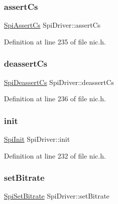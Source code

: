\subsubsection{\texorpdfstring{assert\+Cs}{assertCs}}
{\footnotesize\ttfamily \hyperlink{nic_8h_a5367e86c609a9e08a7fdaeb4ea35035b}{Spi\+Assert\+Cs} Spi\+Driver\+::assert\+Cs}



Definition at line 235 of file nic.\+h.

\mbox{\label{structSpiDriver_af4efd0e67546c1a488d7a4a7e2e58c36}} 
\subsubsection{\texorpdfstring{deassert\+Cs}{deassertCs}}
{\footnotesize\ttfamily \hyperlink{nic_8h_a314bf7aa989ddd1b04e72751382d2a3c}{Spi\+Deassert\+Cs} Spi\+Driver\+::deassert\+Cs}



Definition at line 236 of file nic.\+h.

\mbox{\label{structSpiDriver_a7fd019d8a8a5b17f90924552c69f0203}} 
\subsubsection{\texorpdfstring{init}{init}}
{\footnotesize\ttfamily \hyperlink{nic_8h_a5641b785b2d731fb89fe8e582e5727a6}{Spi\+Init} Spi\+Driver\+::init}



Definition at line 232 of file nic.\+h.

\mbox{\label{structSpiDriver_a3f30ebc4111f9e6e91e9d6971a8ffe8d}} 
\subsubsection{\texorpdfstring{set\+Bitrate}{setBitrate}}
{\footnotesize\ttfamily \hyperlink{nic_8h_aaf7cee9ed915be68ba8c3bbe2a2366ab}{Spi\+Set\+Bitrate} Spi\+Driver\+::set\+Bitrate}



